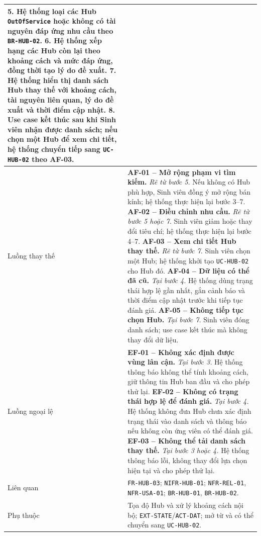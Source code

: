 \begin{longtable}{|L{26mm}|L{118mm}|}
    \textbf{5.} Hệ thống loại các Hub \texttt{OutOfService} hoặc không có tài nguyên đáp ứng nhu cầu theo \texttt{BR-HUB-02}.\newline
    \textbf{6.} Hệ thống xếp hạng các Hub còn lại theo khoảng cách và mức đáp ứng, đồng thời tạo lý do đề xuất.\newline
    \textbf{7.} Hệ thống hiển thị danh sách Hub thay thế với khoảng cách, tài nguyên liên quan, lý do đề xuất và thời điểm cập nhật.\newline
    \textbf{8.} Use case kết thúc sau khi Sinh viên nhận được danh sách; nếu chọn một Hub để xem chi tiết, hệ thống chuyển tiếp sang \texttt{UC-HUB-02} theo AF-03.\\\hline
  Luồng thay thế &
    \textbf{AF-01 -- Mở rộng phạm vi tìm kiếm.} \textit{Rẽ từ bước 5.} Nếu không có Hub phù hợp, Sinh viên đồng ý mở rộng bán kính; hệ thống thực hiện lại bước 3--7.\newline
    \textbf{AF-02 -- Điều chỉnh nhu cầu.} \textit{Rẽ từ bước 5 hoặc 7.} Sinh viên giảm hoặc thay đổi tiêu chí; hệ thống thực hiện lại bước 4--7.\newline
    \textbf{AF-03 -- Xem chi tiết Hub thay thế.} \textit{Rẽ từ bước 7.} Sinh viên chọn một Hub; hệ thống khởi tạo \texttt{UC-HUB-02} cho Hub đó.\newline
    \textbf{AF-04 -- Dữ liệu có thể đã cũ.} \textit{Tại bước 4.} Hệ thống dùng trạng thái hợp lệ gần nhất, gắn cảnh báo và thời điểm cập nhật trước khi tiếp tục đánh giá.\newline
    \textbf{AF-05 -- Không tiếp tục chọn Hub.} \textit{Tại bước 7.} Sinh viên đóng danh sách; use case kết thúc mà không thay đổi dữ liệu.\\\hline
  Luồng ngoại lệ &
    \textbf{EF-01 -- Không xác định được vùng lân cận.} \textit{Tại bước 3.} Hệ thống thông báo không thể tính khoảng cách, giữ thông tin Hub ban đầu và cho phép thử lại.\newline
    \textbf{EF-02 -- Không có trạng thái hợp lệ để đánh giá.} \textit{Tại bước 4.} Hệ thống không đưa Hub chưa xác định trạng thái vào danh sách và thông báo nếu không còn ứng viên có thể đánh giá.\newline
    \textbf{EF-03 -- Không thể tải danh sách thay thế.} \textit{Tại bước 3 hoặc 4.} Hệ thống thông báo lỗi, không thay đổi lựa chọn hiện tại và cho phép thử lại.\\\hline
  Liên quan & \texttt{FR-HUB-03}; \texttt{NIFR-HUB-01}; \texttt{NFR-REL-01}, \texttt{NFR-USA-01}; \texttt{BR-HUB-01}, \texttt{BR-HUB-02}.\\\hline
  Phụ thuộc & Tọa độ Hub và xử lý khoảng cách nội bộ; \texttt{EXT-STATE}/\texttt{ACT-DAT}; mở từ và có thể chuyển sang \texttt{UC-HUB-02}.\\\hline
\end{longtable}
\normalsize

